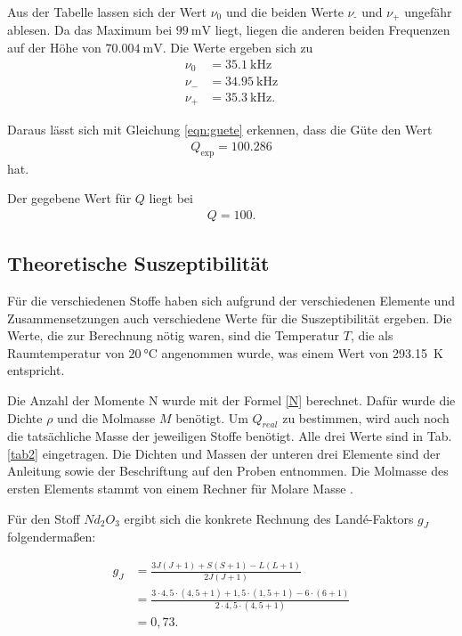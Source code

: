 \noindent Aus der Tabelle lassen sich der Wert $\nu_0$ und die beiden Werte $\nu_\text{-}$ und $\nu_\text{+}$ ungefähr ablesen.
Da das Maximum bei $\SI{99}{\milli\volt}$ liegt, liegen die anderen beiden Frequenzen auf der Höhe von $\SI{70.004}{\milli\volt}$.
Die Werte ergeben sich zu 
\begin{align*} 
 \nu_0 &= \SI{35.1}{\kilo\hertz} \\
 \nu_{-} &= \SI{34.95}{\kilo\hertz} \\
 \nu_{+} &= \SI{35.3}{\kilo\hertz}. 
\end{align*}

\noindent Daraus lässt sich mit Gleichung \eqref{eqn:guete} erkennen, dass die Güte den Wert 
\begin{align*} 
    Q_\text{exp} = \num{100.286}
\end{align*}
hat. 

\noindent Der gegebene Wert für $Q$ liegt bei 
\begin{align*} 
    Q = \num{100}.
\end{align*}


\subsection{Theoretische Suszeptibilität} 
Für die verschiedenen Stoffe haben sich aufgrund der verschiedenen Elemente und Zusammensetzungen auch verschiedene 
Werte für die Suszeptibilität ergeben. 
Die Werte, die zur Berechnung nötig waren, sind die Temperatur $T$, die als Raumtemperatur von $\SI{20}{\celsius}$ angenommen wurde, was einem Wert von \SI{293.15}{\kelvin} entspricht. 

\noindent Die Anzahl der Momente N wurde mit der Formel \eqref{N} berechnet. Dafür wurde die Dichte $\rho$ und die Molmasse $M$ benötigt. Um $Q_{real}$ zu bestimmen, wird auch noch die tatsächliche Masse der jeweiligen Stoffe benötigt. Alle drei Werte sind in Tab. \ref{tab2} eingetragen.
Die Dichten und Massen der unteren drei Elemente sind der Anleitung \cite{V606} sowie der Beschriftung auf den Proben entnommen.
Die Molmasse des ersten Elements stammt von einem Rechner für Molare Masse \cite{C6}.



\noindent Für den Stoff $Nd_2 O_3$ ergibt sich die konkrete Rechnung des Landé-Faktors $g_J$ folgendermaßen: 

\begin{align*}
    g_J &= \frac{3 J (J+1) + S (S+1) - L (L+1)}{2 J (J+1)} \\
        &= \frac{3 \cdot 4,5 \cdot(4,5 + 1) + 1,5 \cdot (1,5 +1) - 6 \cdot (6+1)}{2 \cdot 4,5 \cdot (4,5 + 1)} \\
        &= 0,73.
\end{align*} 

